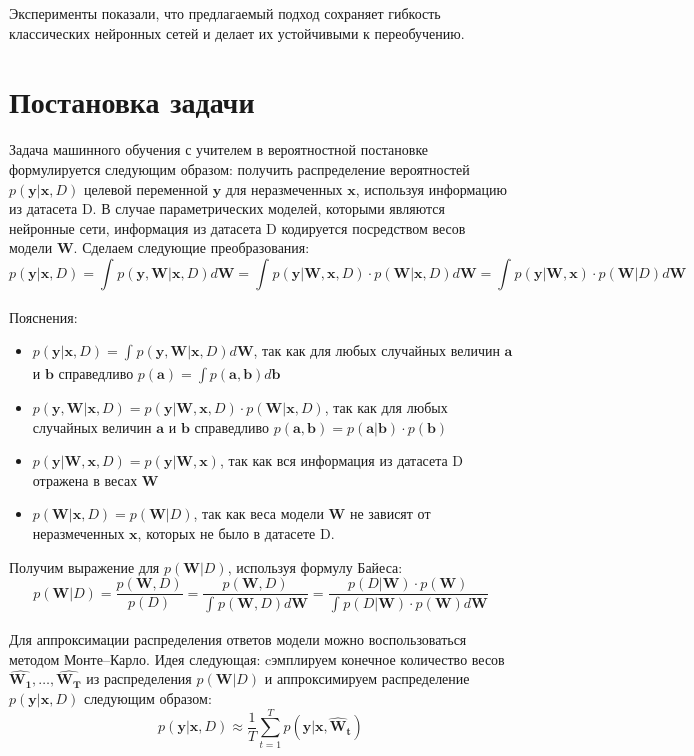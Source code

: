 \documentclass{article}
\begin{document}
Эксперименты показали, что предлагаемый подход сохраняет гибкость классических нейронных сетей и делает их устойчивыми к переобучению.

\section{Постановка задачи}

Задача машинного обучения с учителем в вероятностной постановке формулируется следующим образом: получить распределение вероятностей $p(\pmb{y} | \pmb{x}, D)$ целевой переменной $\pmb{y}$ для неразмеченных $\pmb{x}$, используя информацию из датасета D. В случае параметрических моделей, которыми являются нейронные сети, информация из датасета D кодируется посредством весов модели $\pmb{W}$. Сделаем следующие преобразования:
\[
 p(\pmb{y} | \pmb{x}, D) =
 \int_{}{} p(\pmb{y}, \pmb{W} | \pmb{x}, D) d \pmb{W} =
 \int_{}{} p(\pmb{y} | \pmb{W}, \pmb{x}, D) \cdot p(\pmb{W} | \pmb{x}, D) d \pmb{W} =
 \int_{}{} p(\pmb{y} | \pmb{W}, \pmb{x}) \cdot p(\pmb{W} | D) d \pmb{W}
\]

Пояснения:
\begin{itemize}
 \item $p(\pmb{y} | \pmb{x}, D) = \int_{}{} p(\pmb{y}, \pmb{W} | \pmb{x}, D) d \pmb{W}$, так как для любых случайных величин $\pmb{a}$ и $\pmb{b}$ справедливо $p(\pmb{a}) = \int p(\pmb{a}, \pmb{b}) d \pmb{b}$
 \item $p(\pmb{y}, \pmb{W} | \pmb{x}, D) = p(\pmb{y} | \pmb{W}, \pmb{x}, D) \cdot p(\pmb{W} | \pmb{x}, D)$, так как для любых случайных величин $\pmb{a}$ и $\pmb{b}$ справедливо $p(\pmb{a}, \pmb{b}) = p(\pmb{a}| \pmb{b}) \cdot p(\pmb{b})$
 \item $p(\pmb{y} | \pmb{W}, \pmb{x}, D) = p(\pmb{y} | \pmb{W}, \pmb{x})$, так как вся информация из датасета D отражена в весах $\pmb{W}$
 \item $p(\pmb{W} | \pmb{x}, D) = p(\pmb{W} | D)$, так как веса модели $\pmb{W}$ не зависят от неразмеченных $\pmb{x}$, которых не было в датасете D.
\end{itemize}

Получим выражение для $p(\pmb{W}| D)$, используя формулу Байеса:
\[
 p(\pmb{W}| D) =
 \dfrac{p(\pmb{W}, D)}{p(D)} =
 \dfrac{p(\pmb{W}, D)}{\int_{}{} p(\pmb{W}, D) d \pmb{W}} =
 \dfrac{p(D | \pmb{W}) \cdot p(\pmb{W})}{\int_{}{} p(D | \pmb{W}) \cdot p(\pmb{W}) d \pmb{W}}
\]

Для аппроксимации распределения ответов модели можно воспользоваться методом Монте--Карло. Идея следующая: cэмплируем конечное количество весов $\hat{\pmb{W_1}}, \dots, \hat{\pmb{W_T}}$ из распределения $p(\pmb{W}| D)$  и аппроксимируем распределение $p(\pmb{y} | \pmb{x}, D)$ следующим образом:
\[
 p(\pmb{y} | \pmb{x}, D)
 \approx \dfrac{1}{T} \sum_{t=1}^{T}{p(\pmb{y} | \pmb{x}, \pmb{\hat{W}_{t}})}
\]
\end{document}

